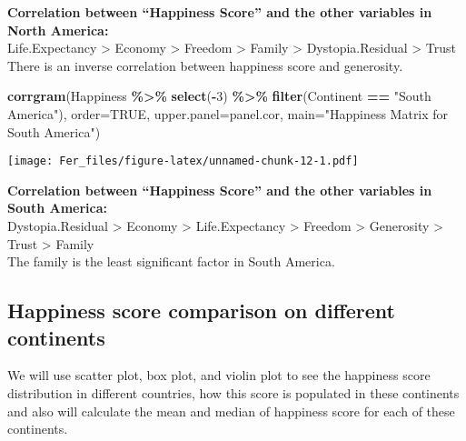 \documentclass[
]{article}
\newenvironment{Shaded}{\begin{snugshade}}{\end{snugshade}}
\newcommand{\AttributeTok}[1]{\textcolor[rgb]{0.13,0.29,0.53}{#1}}
\newcommand{\ConstantTok}[1]{\textcolor[rgb]{0.56,0.35,0.01}{#1}}
\newcommand{\DecValTok}[1]{\textcolor[rgb]{0.00,0.00,0.81}{#1}}
\newcommand{\FunctionTok}[1]{\textcolor[rgb]{0.13,0.29,0.53}{\textbf{#1}}}
\newcommand{\NormalTok}[1]{#1}
\newcommand{\SpecialCharTok}[1]{\textcolor[rgb]{0.81,0.36,0.00}{\textbf{#1}}}
\newcommand{\StringTok}[1]{\textcolor[rgb]{0.31,0.60,0.02}{#1}}
\begin{document}
\textbf{Correlation between ``Happiness Score'' and the other variables
in North America:}\\
Life.Expectancy \textgreater{} Economy \textgreater{} Freedom
\textgreater{} Family \textgreater{} Dystopia.Residual \textgreater{}
Trust\\
There is an inverse correlation between happiness score and generosity.

\begin{Shaded}
\begin{Highlighting}[]
\FunctionTok{corrgram}\NormalTok{(Happiness }\SpecialCharTok{\%\textgreater{}\%} \FunctionTok{select}\NormalTok{(}\SpecialCharTok{{-}}\DecValTok{3}\NormalTok{) }\SpecialCharTok{\%\textgreater{}\%} \FunctionTok{filter}\NormalTok{(Continent }\SpecialCharTok{==} \StringTok{"South America"}\NormalTok{), }\AttributeTok{order=}\ConstantTok{TRUE}\NormalTok{,}
         \AttributeTok{upper.panel=}\NormalTok{panel.cor, }\AttributeTok{main=}\StringTok{"Happiness Matrix for South America"}\NormalTok{)}
\end{Highlighting}
\end{Shaded}

\texttt{[image: Fer\_files/figure-latex/unnamed-chunk-12-1.pdf]}

\textbf{Correlation between ``Happiness Score'' and the other variables
in South America:}\\
Dystopia.Residual \textgreater{} Economy \textgreater{} Life.Expectancy
\textgreater{} Freedom \textgreater{} Generosity \textgreater{} Trust
\textgreater{} Family\\
The family is the least significant factor in South America.

\subsection{Happiness score comparison on different
continents}\label{happiness-score-comparison-on-different-continents}

We will use scatter plot, box plot, and violin plot to see the happiness
score distribution in different countries, how this score is populated
in these continents and also will calculate the mean and median of
happiness score for each of these continents.
\end{document}
